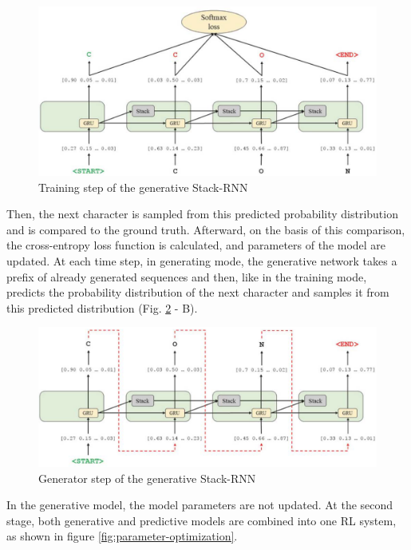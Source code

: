\documentclass[a4paper]{article}
\begin{document}
\begin{figure}[htbp]
		\centering
			\includegraphics[width=\textwidth]{softmax-loss.png}
		\caption{Training step of the generative Stack-RNN}
		\label{fig:softmax-loss}
	\end{figure}
	
Then, the next character is sampled from this predicted probability distribution and is compared to the ground truth. Afterward, on the basis of this comparison, the cross-entropy loss function is calculated, and parameters of the model are updated. 
At each time step, in generating mode, the generative network takes a prefix of already generated sequences and then, like in the training mode, predicts the probability distribution of the next character and samples it from this predicted distribution (Fig. \ref{fig:predicted-distribution} - B). 

\begin{figure}[htbp]
		\centering
			\includegraphics[width=\textwidth]{predicted-distribution.png}
		\caption{Generator step of the generative Stack-RNN}
		\label{fig:predicted-distribution}
	\end{figure}
	
In the generative model, the model parameters are not updated. 
At the second stage, both generative and predictive models are combined into one RL system, as shown in figure \ref{fig:parameter-optimization}. 
\end{document}
